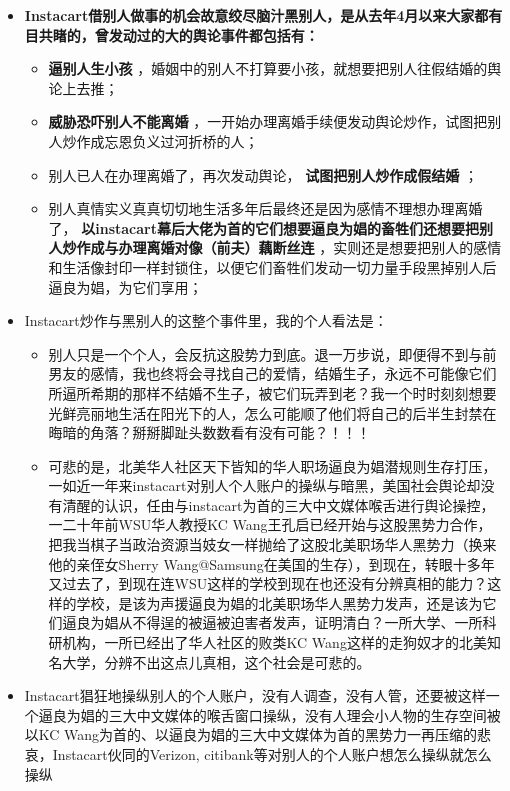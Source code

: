 \documentclass[9pt, b5paper]{article}
\begin{document}
\begin{enumerate}
\begin{itemize}
\item \textbf{Instacart借别人做事的机会故意绞尽脑汁黑别人，是从去年4月以来大家都有目共睹的，曾发动过的大的舆论事件都包括有：}
\begin{itemize}
\item \textbf{逼别人生小孩} ，婚姻中的别人不打算要小孩，就想要把别人往假结婚的舆论上去推；
\item \textbf{威胁恐吓别人不能离婚} ，一开始办理离婚手续便发动舆论炒作，试图把别人炒作成忘恩负义过河折桥的人；
\item 别人已人在办理离婚了，再次发动舆论， \textbf{试图把别人炒作成假结婚} ；
\item 别人真情实义真真切切地生活多年后最终还是因为感情不理想办理离婚了， \textbf{以instacart幕后大佬为首的它们想要逼良为娼的畜牲们还想要把别人炒作成与办理离婚对像（前夫）藕断丝连} ，实则还是想要把别人的感情和生活像封印一样封锁住，以便它们畜牲们发动一切力量手段黑掉别人后逼良为娼，为它们享用；
\end{itemize}
\item Instacart炒作与黑别人的这整个事件里，我的个人看法是： 
\begin{itemize}
\item 别人只是一个个人，会反抗这股势力到底。退一万步说，即便得不到与前男友的感情，我也终将会寻找自己的爱情，结婚生子，永远不可能像它们所逼所希期的那样不结婚不生子，被它们玩弄到老？我一个时时刻刻想要光鲜亮丽地生活在阳光下的人，怎么可能顺了他们将自己的后半生封禁在晦暗的角落？掰掰脚趾头数数看有没有可能？！！！
\item 可悲的是，北美华人社区天下皆知的华人职场逼良为娼潜规则生存打压，一如近一年来instacart对别人个人账户的操纵与暗黑，美国社会舆论却没有清醒的认识，任由与instacart为首的三大中文媒体喉舌进行舆论操控，一二十年前WSU华人教授KC Wang王孔启已经开始与这股黑势力合作，把我当棋子当政治资源当妓女一样抛给了这股北美职场华人黑势力（换来他的亲侄女Sherry Wang@Samsung在美国的生存），到现在，转眼十多年又过去了，到现在连WSU这样的学校到现在也还没有分辨真相的能力？这样的学校，是该为声援逼良为娼的北美职场华人黑势力发声，还是该为它们逼良为娼从不得逞的被逼被迫害者发声，证明清白？一所大学、一所科研机构，一所已经出了华人社区的败类KC Wang这样的走狗奴才的北美知名大学，分辨不出这点儿真相，这个社会是可悲的。
\end{itemize}
\item Instacart猖狂地操纵别人的个人账户，没有人调查，没有人管，还要被这样一个逼良为娼的三大中文媒体的喉舌窗口操纵，没有人理会小人物的生存空间被以KC Wang为首的、以逼良为娼的三大中文媒体为首的黑势力一再压缩的悲哀，Instacart伙同的Verizon, citibank等对别人的个人账户想怎么操纵就怎么操纵

\end{itemize}
\end{enumerate}
\end{document}
